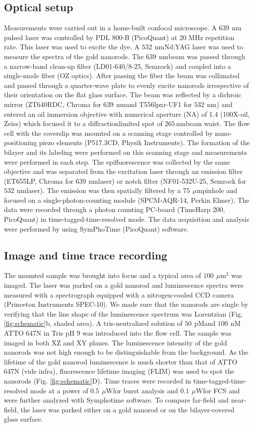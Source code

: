 \documentclass[journal=jpccck,manuscript=article]{achemso}
\newcommand{\uW}{\ensuremath{\,\mu\textrm{W}}}
\newcommand{\nm}{\ensuremath{\,\textrm{nm}}}
\newcommand{\um}{\ensuremath{\,\mu\textrm{m}}}
\newcommand{\nM}{\ensuremath{\,\textrm{nM}}}
\newcommand{\pM}{\ensuremath{\,\textrm{pM}}}
\begin{document}
\subsection{Optical setup}
Measurements were carried out in a home-built confocal microscope. A $639~$\nm pulsed laser was controlled by PDL 800-B (PicoQuant) at 20 MHz repetition rate. This laser was used to excite the dye. A $532~$\nm Nd:YAG laser was used to measure the spectra of the gold nanorods. The $639~$\nm beam was passed through a narrow-band clean-up filter (LD01-640/8-25, Semrock) and coupled into a single-mode fiber (OZ optics). After passing the fiber the beam was collimated and passed through a quarter-wave plate to evenly excite nanorods irrespective of their orientation on the flat glass surface. The beam was reflected by a dichroic mirror (ZT640RDC, Chroma for $639~$\nm and T556lpxr-UF1 for $532~$\nm) and entered an oil immersion objective with numerical aperture (NA) of 1.4 (100X-oil, Zeiss) which focused it to a diffractionlimited spot of $265$\nm beam waist. The flow cell with the coverslip was mounted on a scanning stage controlled by nano-positioning piezo elements (P517.3CD, Physik Instrumente). The formation of the bilayer and its labeling were performed on this scanning stage and measurements were performed in each step. The epifluorescence was collected by the same objective and was separated from the excitation laser through an emission filter (ET655LP, Chroma for $639~$\nm laser) or notch filter (NF01-532U-25, Semrock for $532~$\nm laser). The emission was then spatially filtered by a $75~$\um pinhole and focused on a single-photon-counting module (SPCM-AQR-14, Perkin Elmer). The data were recorded through a photon counting PC-board (TimeHarp 200, PicoQuant) in time-tagged-time-resolved mode. The data acquisition and analysis were performed by using SymPhoTime (PicoQuant) software.
\subsection{Image and time trace recording}
The mounted sample was brought into focus and a typical area of $100~\um^2$ was imaged. The laser was parked on a gold nanorod and luminescence spectra were measured with a spectrograph equipped with a nitrogen-cooled CCD camera (Princeton Instruments SPEC-10). We made sure that the nanorods are single by verifying that the line shape of the luminescence spectrum was Lorentzian (Fig. \ref{fig:schematic}b, shaded area). A tris-neutralized solution of $50~$\pM and $100~$\nM ATTO 647N in Tris pH 9 was introduced into the flow cell. The sample was imaged in both XZ and XY planes. The luminescence intensity of the gold nanorods was not high enough to be distinguishable from the background. As the lifetime of the gold nanorod luminescence is much shorter than that of ATTO 647N (vide infra), fluorescence lifetime imaging (FLIM) was used to spot the nanorods (Fig. \ref{fig:schematic}D). Time traces were recorded in time-tagged-time-resolved mode at a power of $0.5~$\uW for burst analysis and $0.1~$\uW for FCS and were further analyzed with Symphotime software. To compare far-field and near-field, the laser was parked either on a gold nanorod or on the bilayer-covered glass surface.
\end{document}

